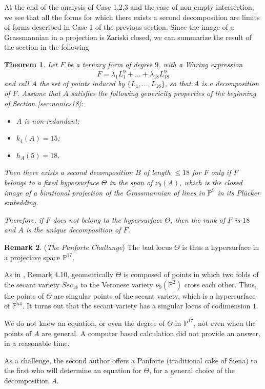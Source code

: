 \documentclass{amsart}
\newcommand{\Pj}{\mathbb{P}}
\newtheorem{thm0}{Theorem}[section]
\theoremstyle{definition}
\newtheorem{rem0}[thm0]{Remark}
\begin{document}
At the end of the analysis of Case 1,2,3 and the case of non empty intersection, we see that all the forms for which there exists a second
decomposition are limits of forms described in Case 1 of the previous section. Since the image of a Grassmannian in a projection
is Zariski closed, we can summarize the result of the section in the following

\begin{thm0}\label{th9} Let $F$ be a ternary form of degree $9$, with a Waring expression
$$ F= \lambda_1L_1^9+\dots +\lambda_{18} L_{18}^9$$
and call $A$ the set of points induced by $\{L_1,\dots, L_{18}\}$, so that $A$ is a  decomposition of $F$. 
Assume that $A$ satisfies the following genericity properties 
of the beginning of Section \ref{sec:nonics18}:
\begin{itemize}
\item[(i)] $ A $ is non-redundant;
\item[(ii)] $ k_{4}(A)  =15$;
\item[(iii)] $ h_{A}(5) =18$.
\end{itemize}
Then there exists a second decomposition $B$ of length $\leq18$ for $F$ only if $F$ belongs to a fixed hypersurface
$\Theta$ in the span of $\nu_9(A)$, which is the closed image of a birational projection of the Grassmannian
of lines in $\Pj^9$ in its Pl\"ucker embedding.

Therefore, if $F$ does not belong to the hypersurface $\Theta$, then the rank of $F$ is $18$ and $A$ is the
unique decomposition of $F$.
\end{thm0}

\begin{rem0}\label{panforte} ({\it The Panforte Challange}) The bad locus $\Theta$ is thus a hypersurface in a projective space $\Pj^{17}$. 

As in \cite{AngeC}, Remark 4.10, geometrically $\Theta$ is composed of points in which two folds of the secant variety
$Sec_{18}$ to the Veronese variety $\nu_9(\Pj^2)$ cross each other. Thus, the points of $\Theta$ are singular points
 of the secant variety, which is a hypersurface of $\Pj^{54}$. It turns out that the secant variety has a singular locus of codimension $1$.

We do not know an equation, or even the degree of $\Theta$ in $\Pj^{17}$, not even when the points of $A$ are general.
A computer based calculation did not provide an answer, in a reasonable time.

As a challenge, the second author offers a Panforte (traditional cake of Siena) to the first who will
determine an equation for $\Theta$, for a general choice of the decomposition $A$.
\end{rem0}
\end{document}
